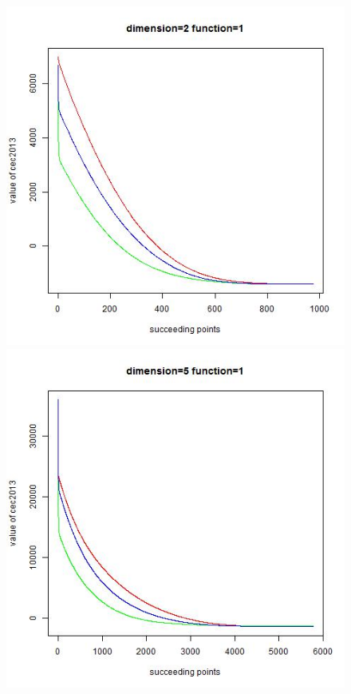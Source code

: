 \documentclass{article}
\begin{document}
\begin{figure}[!htb]
\centering
{}
  \includegraphics[width=\linewidth]{dim_2__func_1}
\endminipage\hfill
{}
  \includegraphics[width=\linewidth]{dim_5__func_1}

\end{figure}
\end{document}

